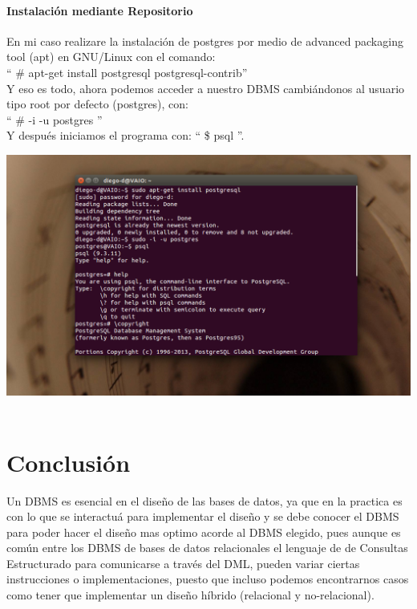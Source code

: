 \documentclass[spanish,12pt,letterpapper]{article}
\begin{document}
	\paragraph{Instalación mediante Repositorio\\}
	En mi caso realizare la instalación de postgres por medio de advanced packaging tool (apt) en GNU/Linux con el comando:\\
	`` \# apt-get install postgresql postgresql-contrib'' \\ 
	Y eso es todo, ahora podemos acceder a nuestro DBMS cambiándonos al usuario tipo root por defecto (postgres), con:\\
	 `` \# -i -u postgres ''\\
	 Y después iniciamos el programa con: `` \$ psql ''.\\
	 	 
	 \begin{center}
	 \includegraphics[width=1\textwidth]{./install_screenshot}~\\[1cm]
	 \end{center}
	 \pagebreak
	
	\section{Conclusión}
	Un DBMS es esencial en el diseño de las bases de datos, ya que en la practica es con lo que se interactuá para implementar el diseño y se debe conocer el DBMS para poder hacer el diseño mas optimo acorde al DBMS elegido, pues aunque es común entre los DBMS de bases de datos relacionales el lenguaje de de Consultas Estructurado para comunicarse a través del DML, pueden variar ciertas instrucciones o implementaciones, puesto que incluso podemos encontrarnos casos como tener que implementar un diseño híbrido (relacional y no-relacional).
	 
\end{document}
